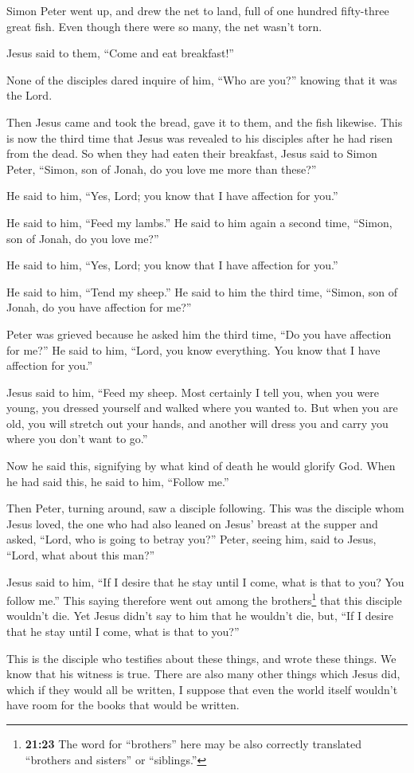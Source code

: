 Simon Peter went up, and drew the net to land, full of
one hundred fifty-three great fish. Even though there were so many, the
net wasn't torn.

 Jesus said to them, ``Come and eat breakfast!''

None of the disciples dared inquire of him, ``Who are you?'' knowing
that it was the Lord.

 Then Jesus came and took the bread, gave it to them, and
the fish likewise.  This is now the third time that Jesus
was revealed to his disciples after he had risen from the dead.
 So when they had eaten their breakfast, Jesus said to
Simon Peter, ``Simon, son of Jonah, do you love me more than these?''

He said to him, ``Yes, Lord; you know that I have affection for you.''

He said to him, ``Feed my lambs.''  He said to him again
a second time, ``Simon, son of Jonah, do you love me?''

He said to him, ``Yes, Lord; you know that I have affection for you.''

He said to him, ``Tend my sheep.''  He said to him the
third time, ``Simon, son of Jonah, do you have affection for me?''

Peter was grieved because he asked him the third time, ``Do you have
affection for me?'' He said to him, ``Lord, you know everything. You
know that I have affection for you.''

Jesus said to him, ``Feed my sheep.  Most certainly I
tell you, when you were young, you dressed yourself and walked where you
wanted to. But when you are old, you will stretch out your hands, and
another will dress you and carry you where you don't want to go.''

 Now he said this, signifying by what kind of death he
would glorify God. When he had said this, he said to him, ``Follow me.''

 Then Peter, turning around, saw a disciple following.
This was the disciple whom Jesus loved, the one who had also leaned on
Jesus' breast at the supper and asked, ``Lord, who is going to betray
you?''  Peter, seeing him, said to Jesus, ``Lord, what
about this man?''

 Jesus said to him, ``If I desire that he stay until I
come, what is that to you? You follow me.''  This saying
therefore went out among the brothers\footnote{\textbf{21:23} The word
  for ``brothers'' here may be also correctly translated ``brothers and
  sisters'' or ``siblings.''} that this disciple wouldn't die. Yet Jesus
didn't say to him that he wouldn't die, but, ``If I desire that he stay
until I come, what is that to you?''

 This is the disciple who testifies about these things,
and wrote these things. We know that his witness is true.
 There are also many other things which Jesus did, which
if they would all be written, I suppose that even the world itself
wouldn't have room for the books that would be written.
